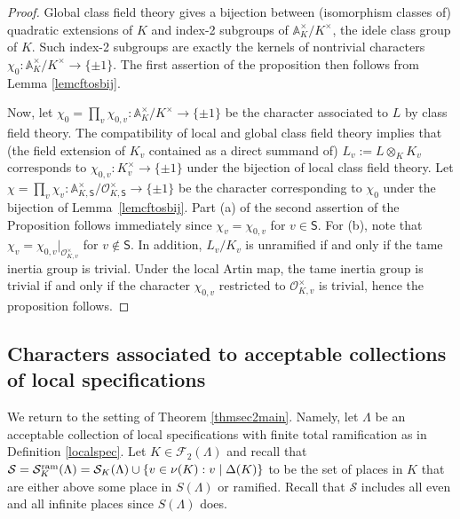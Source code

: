 \documentclass[10pt]{article}
\theoremstyle{plain}
\theoremstyle{definition}
\theoremstyle{remark}
\def\CS{{\mathsf S}}
\def\bA{{\mathbb A}}
\def\O{{\mathcal O}}
\def\cF{{\mathcal F}}
\def\cS{{\mathcal S}}
\newcommand{\A}{\mathbb{A}}
\begin{document}
\begin{proof}
Global class field theory gives a bijection between (isomorphism
classes of) quadratic extensions of $K$ and index-2 subgroups of
$\bA_K^\times/K^\times$, the idele class group of $K$. Such index-2
subgroups are exactly the kernels of nontrivial characters $\chi_0:
\bA_K^\times/K^\times \rightarrow \{\pm 1\}$. The first assertion of
the proposition then follows from Lemma \ref{lemcftosbij}.

Now, let $\chi_0 = \prod_{v}\chi_{0,v}:\A_K^\times/K^\times\to\{\pm
1\}$ be the character associated to $L$ by class field theory. The
compatibility of local and global class field theory implies that (the
field extension of $K_v$ contained as a direct summand of)
$L_v:=L\otimes_K K_v$ corresponds to $\chi_{0,v}:K_v^\times\to\{\pm
1\}$ under the bijection of local class field theory.  Let
$\chi=\prod_v\chi_v:\A_{K,\CS}^\times/\O_{K,\CS}^\times\to\{\pm 1\}$
be the character corresponding to $\chi_0$ under the bijection of
Lemma~\ref{lemcftosbij}.  Part (a) of the second assertion of the
Proposition follows immediately since $\chi_v=\chi_{0,v}$ for $v\in
\CS$. For (b), note that $\chi_v=\chi_{0,v}|_{\O_{K,v}^\times}$ for
$v\not\in \CS$. In addition, $L_v/K_v$ is unramified if and only if
the tame inertia group is trivial. Under the local Artin map, the tame
inertia group is trivial if and only if the character $\chi_{0,v}$
restricted to $\O_{K,v}^\times$ is trivial, hence the proposition
follows.
\end{proof}


\subsection{Characters associated to  acceptable collections of local specifications}\label{3.2}


We return to the setting of Theorem \ref{thmsec2main}. Namely, let
$\Lambda$ be an acceptable collection of local
specifications with finite total ramification as in Definition \ref{localspec}. Let $K\in\cF_2(\Lambda)$ and recall that
$\cS  = \cS_K^{\rm ram}(\Lambda) = \cS_K(\Lambda)\cup\{v \in \nu(K) :v\mid\Delta(K)\}$ to be the set of places
in $K$ that are either above some place in $S(\Lambda)$ or
ramified. Recall  that $\cS$ includes all even and all infinite places
since $S(\Lambda)$ does.
\end{document}
